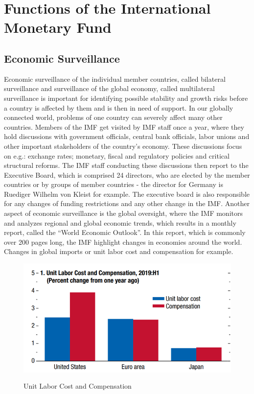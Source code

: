 \section{Functions of the International Monetary Fund}
\label{sec:functions}

\subsection{Economic Surveillance}
Economic surveillance of the individual member countries, called bilateral surveillance and surveillance of the global economy, called multilateral surveillance is important for identifying possible stability and growth risks before a country is affected by them and is then in need of support. In our globally connected world, problems of one country can severely affect many other countries. Members of the \gls{IMF} get visited by \gls{IMF} staff once a year, where they hold discussions with government officials, central bank officials, labor unions and other important stakeholders of the country’s economy. These discussions focus on e.g.: exchange rates; monetary, fiscal and regulatory policies and critical structural reforms. The \gls{IMF} staff conducting these discussions then report to the Executive Board, which is comprised 24 directors, who are elected by the member countries or by groups of member countries - the director for Germany is Ruediger Wilhelm von Kleist for example. The executive board is also responsible for any changes of funding restrictions and any other change in the \gls{IMF}. Another aspect of economic surveillance is the global oversight, where the \gls{IMF} monitors and analyzes regional and global economic trends, which results in a monthly report, called the \enquote{World Economic Outlook}. In this report, which is commonly over 200 pages long, the \gls{IMF} highlight changes in economies around the world. Changes in global imports or unit labor cost and compensation for example.

\begin{figure}[!h]
\centering
\begin{minipage}[t]{.7\textwidth} %
\caption{Unit Labor Cost and Compensation} %
\includegraphics[width=1\textwidth]{img/laborcostcompensation.png}\\ %
\label{fig:weoexample1}
\end{minipage}
\end{figure}

